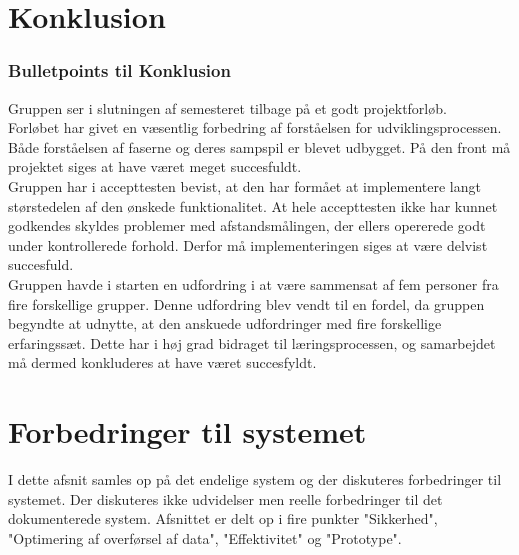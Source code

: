 \chapter{Konklusion}
\label{ch:konklusion}
\subsection{Bulletpoints til Konklusion}
Gruppen ser i slutningen af semesteret tilbage på et godt projektforløb. \\
Forløbet har givet en væsentlig forbedring af forståelsen for udviklingsprocessen. Både forståelsen af faserne og deres sampspil er blevet udbygget. På den front må projektet siges at have været meget succesfuldt.\\
Gruppen har i accepttesten bevist, at den har formået at implementere langt størstedelen af den ønskede funktionalitet. At hele accepttesten ikke har kunnet godkendes skyldes problemer med afstandsmålingen, der ellers opererede godt under kontrollerede forhold. Derfor må implementeringen siges at være delvist succesfuld.\\
Gruppen havde i starten en udfordring i at være sammensat af fem personer fra fire forskellige grupper. Denne udfordring blev vendt til en fordel, da gruppen begyndte at udnytte, at den anskuede udfordringer med fire forskellige erfaringssæt. Dette har i høj grad bidraget til læringsprocessen, og samarbejdet må dermed konkluderes  at have været succesfyldt.\\

\chapter{Forbedringer til systemet}
\label{ch:Forbedringer}
I dette afsnit samles op på det endelige system og der diskuteres forbedringer til systemet. Der diskuteres ikke udvidelser men reelle forbedringer til det dokumenterede system. Afsnittet er delt op i fire punkter "Sikkerhed", "Optimering af overførsel af data", "Effektivitet" og "Prototype". 


